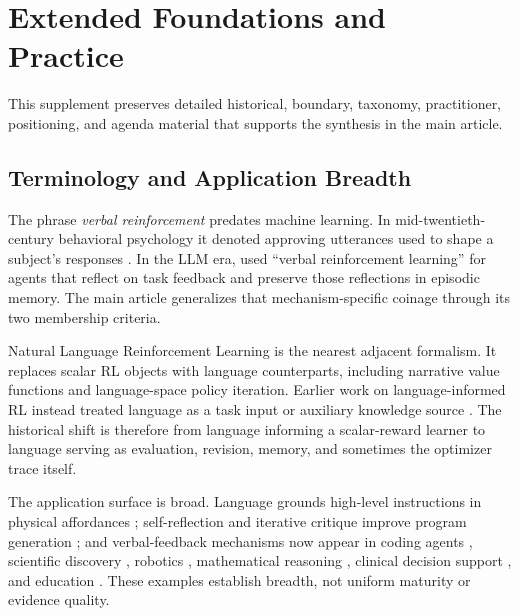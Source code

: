 \section{Extended Foundations and Practice}
\label{supp:sec:foundations-practice}

This supplement preserves detailed historical, boundary, taxonomy, practitioner, positioning, and agenda material that supports the synthesis in the main article.

\subsection{Terminology and Application Breadth}
\label{supp:subsec:genealogy-applications}

The phrase \emph{verbal reinforcement} predates machine learning. In mid-twentieth-century behavioral psychology it denoted approving utterances used to shape a subject's responses \citep{greenspoon1955reinforcing,krasner1958studies}. In the LLM era, \citet{shinn2023reflexion} used ``verbal reinforcement learning'' for agents that reflect on task feedback and preserve those reflections in episodic memory. The main article generalizes that mechanism-specific coinage through its two membership criteria.

Natural Language Reinforcement Learning \citep{feng2024natural} is the nearest adjacent formalism. It replaces scalar RL objects with language counterparts, including narrative value functions and language-space policy iteration. Earlier work on language-informed RL instead treated language as a task input or auxiliary knowledge source \citep{branavan2009reinforcement,luketina2019survey}. The historical shift is therefore from language informing a scalar-reward learner to language serving as evaluation, revision, memory, and sometimes the optimizer trace itself.

The application surface is broad. Language grounds high-level instructions in physical affordances \citep{ahn2022can}; self-reflection and iterative critique improve program generation \citep{shinn2023reflexion,madaan2023selfrefine}; and verbal-feedback mechanisms now appear in coding agents \citep{yang2024swe,jimenez2024swebenchlanguagemodelsresolve}, scientific discovery \citep{m2024augmenting,lu2024ai}, robotics \citep{wang2023voyager}, mathematical reasoning \citep{hatamizadeh2026igrpo,liu2026dual,shi2025ssr}, clinical decision support \citep{huang2025medreflect,zhou2025enhancing}, and education \citep{qian2025dean,ahtisham2026ai}. These examples establish breadth, not uniform maturity or evidence quality.

